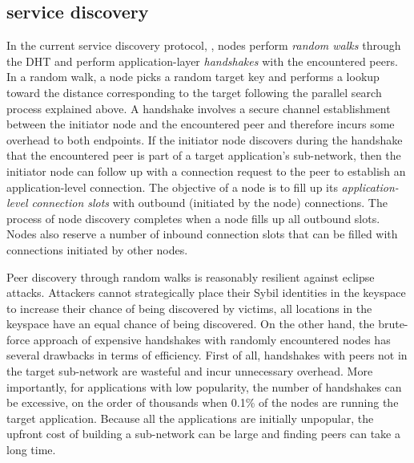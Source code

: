 \subsection{\discv service discovery}
\label{sec:background:discv4}
In the current service discovery protocol, \discv, nodes perform \textit{random walks} through the DHT and perform application-layer \emph{handshakes} with the encountered peers.
In a random walk, a node picks a random target key and performs a lookup toward the distance corresponding to the target following the parallel search process explained above. 
A handshake involves a secure channel establishment between the initiator node and the encountered peer and therefore incurs some overhead to both endpoints. If the initiator node discovers during the handshake that the encountered peer is part of a target application's sub-network, then the initiator node can follow up with a connection request to the peer to establish an application-level connection. The objective of a node is to fill up its \textit{application-level connection slots} with outbound (\ie initiated by the node) connections. The process of node discovery completes when a node fills up all outbound slots. Nodes also reserve a number of inbound connection slots that can be filled with connections initiated by other nodes. 

Peer discovery through random walks is reasonably resilient against eclipse attacks. Attackers cannot strategically place their Sybil identities in the keyspace to increase their chance of being discovered by victims, \ie all locations in the keyspace have an equal chance of being discovered.
On the other hand, the brute-force approach of expensive handshakes with randomly encountered nodes has several drawbacks in terms of efficiency. First of all, handshakes with peers not in the target sub-network are wasteful and incur unnecessary overhead. %
More importantly, for applications with low popularity, the number of handshakes can be excessive, \ie on the order of thousands when 0.1\% of the nodes are running the target application. Because all the applications are initially unpopular, the upfront cost of building a sub-network can be large and finding peers can take a long time.
